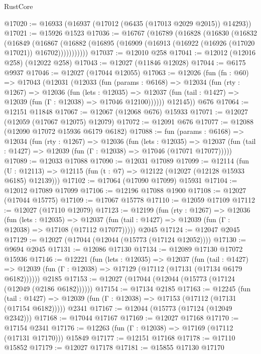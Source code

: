 \begin{lexlean}{RustCore}
\begin{coremodule}
@17020 := @16933 (@16937 (@17012 (@6435 (@17013 @2029 @2015)) @14293))
@17021 := @15926 @1523
@17036 := @16767
    (@16789
      (@16828
        (@16830
          (@16832
            (@16849
              (@16867
                (@16882 (@16895 (@16909 (@16913 (@16922 (@16926 (@17020 @17021)) @16702)))))))))))
@17037 := @12010 @258
@17041 := @12012 (@12016 @258) (@12022 @258)
@17043 := @12027 (@11846 @12028)
@17044 := @6175 @9937
@17046 := @12027 (@17044 @12055)
@17063 := @12026
    (fun (fn : @60) =>
    @17043
      (@12031
        (@12033
          (fun (params : @6168) =>
          @12034
            (fun (rty : @1267) =>
            @12036
              (fun (lets : @12035) =>
              @12037 (fun (tail : @1427) => @12039 (fun (Γ : @12038) => @17046 @12100))))))
        @12145))
    @676
@17064 := @12151 @11848
@17067 := @12067 (@12068 @676) @15933
@17071 := @12027 (@12059 (@17067 @12075) @12079)
@17072 := @12091 @676
@17077 := @12088 (@12090 @17072 @15936 @6179 @6182)
@17088 := fun (params : @6168) =>
  @12034
    (fun (rty : @1267) =>
    @12036
      (fun (lets : @12035) =>
      @12037 (fun (tail : @1427) => @12039 (fun (Γ : @12038) => @17046 (@17071 @17077)))))
@17089 := @12033 @17088
@17090 := @12031 @17089
@17099 := @12114
    (fun (U : @12113) => @12115 (fun (t : @7) => @12122 (@12027 (@12128 @15933 @6185) @12139)))
@17102 := @17064 (@17090 @17099) @15931
@17104 := @12012 @17089 @17099
@17106 := @12196 @17088 @1900
@17108 := @12027 (@17044 @15775)
@17109 := @17067 @15778
@17110 := @12059 @17109
@17112 := @12027 (@17110 @12079)
@17123 := @12199
    (fun (rty : @1267) =>
    @12036
      (fun (lets : @12035) =>
      @12037 (fun (tail : @1427) => @12039 (fun (Γ : @12038) => @17108 (@17112 @17077)))))
    @2045
@17124 := @12047 @2045
@17129 := @12027 (@17044 (@12044 (@15773 (@17124 @12052))))
@17130 := @9694 @2045
@17131 := @12086 @17130
@17134 := @12089 @17130 @17072 @15936
@17146 := @12221
    (fun (lets : @12035) =>
    @12037
      (fun (tail : @1427) =>
      @12039 (fun (Γ : @12038) => @17129 (@17112 (@17131 (@17134 @6179 @6182))))))
    @2185
@17153 := @12027 (@17044 (@12044 (@15773 (@17124 (@12049 (@2186 @6182))))))
@17154 := @17134 @2185
@17163 := @12245
    (fun (tail : @1427) => @12039 (fun (Γ : @12038) => @17153 (@17112 (@17131 (@17154 @6182)))))
    @2341
@17167 := @12044 (@15773 (@17124 (@12049 @2342)))
@17168 := @17044 @17167
@17169 := @12027 @17168
@17170 := @17154 @2341
@17176 := @12263 (fun (Γ : @12038) => @17169 (@17112 (@17131 @17170))) @15849
@17177 := @12151 @17168
@17178 := @17110 @15852
@17179 := @12027 @17178
@17181 := @15855 @17130 @17170

\end{coremodule}
\end{lexlean}
